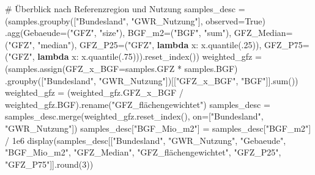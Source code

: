 \documentclass[
  ngerman,
  a4paper,
  DIV=11]{scrreprt}
\newenvironment{Shaded}{\begin{snugshade}}{\end{snugshade}}
\newcommand{\BuiltInTok}[1]{\textcolor[rgb]{0.00,0.23,0.31}{#1}}
\newcommand{\CommentTok}[1]{\textcolor[rgb]{0.37,0.37,0.37}{#1}}
\newcommand{\DecValTok}[1]{\textcolor[rgb]{0.68,0.00,0.00}{#1}}
\newcommand{\FloatTok}[1]{\textcolor[rgb]{0.68,0.00,0.00}{#1}}
\newcommand{\KeywordTok}[1]{\textcolor[rgb]{0.00,0.23,0.31}{\textbf{#1}}}
\newcommand{\NormalTok}[1]{\textcolor[rgb]{0.00,0.23,0.31}{#1}}
\newcommand{\OperatorTok}[1]{\textcolor[rgb]{0.37,0.37,0.37}{#1}}
\newcommand{\StringTok}[1]{\textcolor[rgb]{0.13,0.47,0.30}{#1}}
\newcommand{\VariableTok}[1]{\textcolor[rgb]{0.07,0.07,0.07}{#1}}
\begin{document}
\begin{Shaded}
\begin{Highlighting}[]
\CommentTok{\# Überblick nach Referenzregion und Nutzung}
\NormalTok{samples\_desc }\OperatorTok{=}\NormalTok{ (samples.groupby([}\StringTok{"Bundesland"}\NormalTok{, }\StringTok{"GWR\_Nutzung"}\NormalTok{], observed}\OperatorTok{=}\VariableTok{True}\NormalTok{)}
\NormalTok{    .agg(Gebaeude}\OperatorTok{=}\NormalTok{(}\StringTok{"GFZ"}\NormalTok{, }\StringTok{"size"}\NormalTok{), BGF\_m2}\OperatorTok{=}\NormalTok{(}\StringTok{"BGF"}\NormalTok{, }\StringTok{"sum"}\NormalTok{),}
\NormalTok{         GFZ\_Median}\OperatorTok{=}\NormalTok{(}\StringTok{"GFZ"}\NormalTok{, }\StringTok{"median"}\NormalTok{), GFZ\_P25}\OperatorTok{=}\NormalTok{(}\StringTok{"GFZ"}\NormalTok{, }\KeywordTok{lambda}\NormalTok{ x: x.quantile(}\FloatTok{.25}\NormalTok{)),}
\NormalTok{         GFZ\_P75}\OperatorTok{=}\NormalTok{(}\StringTok{"GFZ"}\NormalTok{, }\KeywordTok{lambda}\NormalTok{ x: x.quantile(}\FloatTok{.75}\NormalTok{))).reset\_index())}
\NormalTok{weighted\_gfz }\OperatorTok{=}\NormalTok{ (samples.assign(GFZ\_x\_BGF}\OperatorTok{=}\NormalTok{samples.GFZ }\OperatorTok{*}\NormalTok{ samples.BGF)}
\NormalTok{    .groupby([}\StringTok{"Bundesland"}\NormalTok{, }\StringTok{"GWR\_Nutzung"}\NormalTok{])[[}\StringTok{"GFZ\_x\_BGF"}\NormalTok{, }\StringTok{"BGF"}\NormalTok{]].}\BuiltInTok{sum}\NormalTok{())}
\NormalTok{weighted\_gfz }\OperatorTok{=}\NormalTok{ (weighted\_gfz.GFZ\_x\_BGF }\OperatorTok{/}\NormalTok{ weighted\_gfz.BGF).rename(}\StringTok{"GFZ\_flächengewichtet"}\NormalTok{)}
\NormalTok{samples\_desc }\OperatorTok{=}\NormalTok{ samples\_desc.merge(weighted\_gfz.reset\_index(), on}\OperatorTok{=}\NormalTok{[}\StringTok{"Bundesland"}\NormalTok{, }\StringTok{"GWR\_Nutzung"}\NormalTok{])}
\NormalTok{samples\_desc[}\StringTok{"BGF\_Mio\_m2"}\NormalTok{] }\OperatorTok{=}\NormalTok{ samples\_desc[}\StringTok{"BGF\_m2"}\NormalTok{] }\OperatorTok{/} \FloatTok{1e6}
\NormalTok{display(samples\_desc[[}\StringTok{"Bundesland"}\NormalTok{, }\StringTok{"GWR\_Nutzung"}\NormalTok{, }\StringTok{"Gebaeude"}\NormalTok{, }\StringTok{"BGF\_Mio\_m2"}\NormalTok{,}
                      \StringTok{"GFZ\_Median"}\NormalTok{, }\StringTok{"GFZ\_flächengewichtet"}\NormalTok{, }\StringTok{"GFZ\_P25"}\NormalTok{, }\StringTok{"GFZ\_P75"}\NormalTok{]].}\BuiltInTok{round}\NormalTok{(}\DecValTok{3}\NormalTok{))}


\end{Highlighting}
\end{Shaded}
\end{document}
